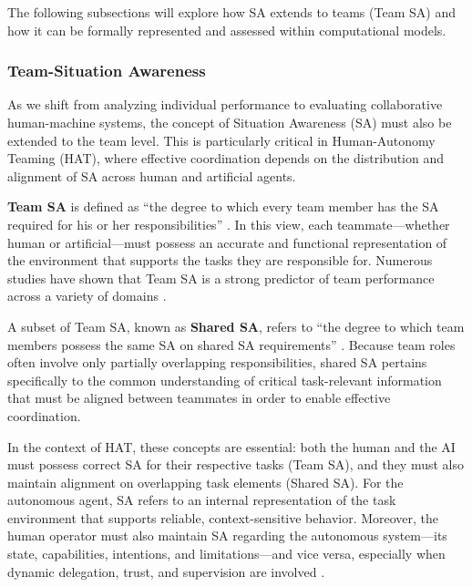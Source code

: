 \documentclass[12pt,a4paper]{article} %
\begin{document}
	The following subsections will explore how SA extends to teams (Team SA) and how it can be formally represented and assessed within computational models.

	\subsubsection{Team-Situation Awareness}

	As we shift from analyzing individual performance to evaluating collaborative human-machine systems, the concept of Situation Awareness (SA) must also be extended to the team level. This is particularly critical in Human-Autonomy Teaming (HAT), where effective coordination depends on the distribution and alignment of SA across human and artificial agents.

	\textbf{Team SA} is defined as “the degree to which every team member has the SA required for his or her responsibilities” \parencite{endsley_measurement_1995}. In this view, each teammate—whether human or artificial—must possess an accurate and functional representation of the environment that supports the tasks they are responsible for. Numerous studies have shown that Team SA is a strong predictor of team performance across a variety of domains \parencite{cooke_measuring_2001,prince_measurement_2007,parush_individuals_2017}.

	A subset of Team SA, known as \textbf{Shared SA}, refers to “the degree to which team members possess the same SA on shared SA requirements” \parencite{endsley_designing_2003}. Because team roles often involve only partially overlapping responsibilities, shared SA pertains specifically to the common understanding of critical task-relevant information that must be aligned between teammates in order to enable effective coordination.

	In the context of HAT, these concepts are essential: both the human and the AI must possess correct SA for their respective tasks (Team SA), and they must also maintain alignment on overlapping task elements (Shared SA). For the autonomous agent, SA refers to an internal representation of the task environment that supports reliable, context-sensitive behavior. Moreover, the human operator must also maintain SA regarding the autonomous system—its state, capabilities, intentions, and limitations—and vice versa, especially when dynamic delegation, trust, and supervision are involved \parencite{endsley_designing_2003,national_academies_of_sciences_engineering_and_medicine_human-ai_2022}.
\end{document}
